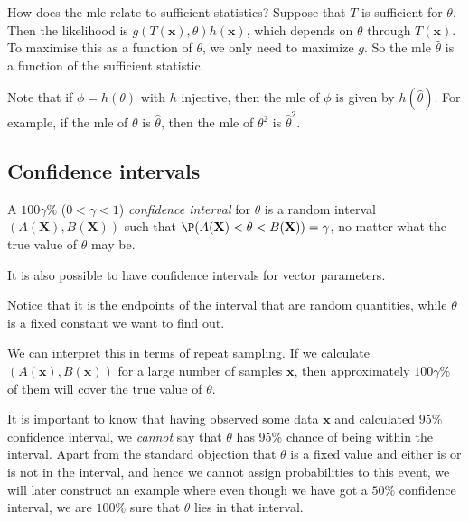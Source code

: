 \documentclass[a4paper]{article}
\begin{document}
How does the mle relate to sufficient statistics? Suppose that $T$ is sufficient for $\theta$. Then the likelihood is $g(T(\mathbf{x}), \theta)h(\mathbf{x})$, which depends on $\theta$ through $T(\mathbf{x})$. To maximise this as a function of $\theta$, we only need to maximize $g$. So the mle $\hat{\theta}$ is a function of the sufficient statistic.

Note that if $\phi = h(\theta)$ with $h$ injective, then the mle of $\phi$ is given by $h(\hat{\theta})$. For example, if the mle of $\theta$ is $\hat{\theta}$, then the mle of $\theta^2$ is $\hat{\theta}^2$.

\subsection{Confidence intervals}
\begin{defi}
  A $100\gamma\%$ ($0 < \gamma < 1$) \emph{confidence interval} for $\theta$ is a random interval $(A(\mathbf{X}), B(\mathbf{X}))$ such that $\P(A(\mathbf{X}) < \theta < B(\mathbf{X})) = \gamma$, no matter what the true value of $\theta$ may be.
\end{defi}
It is also possible to have confidence intervals for vector parameters.

Notice that it is the endpoints of the interval that are random quantities, while $\theta$ is a fixed constant we want to find out.

We can interpret this in terms of repeat sampling. If we calculate $(A(\mathbf{x}), B(\mathbf{x}))$ for a large number of samples $\mathbf{x}$, then approximately $100\gamma\%$ of them will cover the true value of $\theta$.

It is important to know that having observed some data $\mathbf{x}$ and calculated $95\%$ confidence interval, we \emph{cannot} say that $\theta$ has 95\% chance of being within the interval. Apart from the standard objection that $\theta$ is a fixed value and either is or is not in the interval, and hence we cannot assign probabilities to this event, we will later construct an example where even though we have got a $50\%$ confidence interval, we are $100\%$ sure that $\theta$ lies in that interval.
\end{document}
